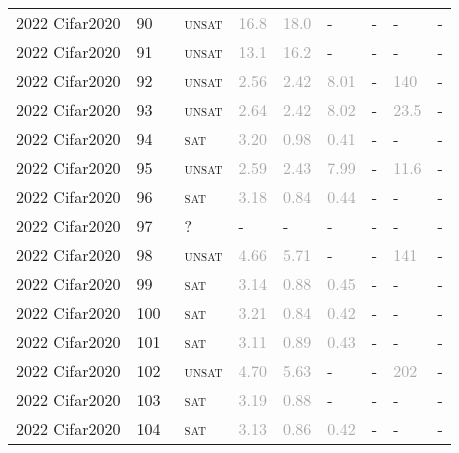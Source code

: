 \begin{center}
{\begin{longtable}{@{}lllllllll@{}}
2022 Cifar2020 & 90 & ~\textsc{unsat} & \textcolor{darkgray}{16.8} & \textcolor{darkgray}{18.0} & - & - & - & - \\
2022 Cifar2020 & 91 & ~\textsc{unsat} & \textcolor{darkgray}{13.1} & \textcolor{darkgray}{16.2} & - & - & - & - \\
2022 Cifar2020 & 92 & ~\textsc{unsat} & \textcolor{darkgray}{2.56} & \textcolor{darkgray}{2.42} & \textcolor{darkgray}{8.01} & - & \textcolor{darkgray}{140} & - \\
2022 Cifar2020 & 93 & ~\textsc{unsat} & \textcolor{darkgray}{2.64} & \textcolor{darkgray}{2.42} & \textcolor{darkgray}{8.02} & - & \textcolor{darkgray}{23.5} & - \\
2022 Cifar2020 & 94 & ~\textsc{sat} & \textcolor{darkgray}{3.20} & \textcolor{darkgray}{0.98} & \textcolor{darkgray}{0.41} & - & - & - \\
2022 Cifar2020 & 95 & ~\textsc{unsat} & \textcolor{darkgray}{2.59} & \textcolor{darkgray}{2.43} & \textcolor{darkgray}{7.99} & - & \textcolor{darkgray}{11.6} & - \\
2022 Cifar2020 & 96 & ~\textsc{sat} & \textcolor{darkgray}{3.18} & \textcolor{darkgray}{0.84} & \textcolor{darkgray}{0.44} & - & - & - \\
2022 Cifar2020 & 97 & ~? & - & - & - & - & - & - \\
2022 Cifar2020 & 98 & ~\textsc{unsat} & \textcolor{darkgray}{4.66} & \textcolor{darkgray}{5.71} & - & - & \textcolor{darkgray}{141} & - \\
2022 Cifar2020 & 99 & ~\textsc{sat} & \textcolor{darkgray}{3.14} & \textcolor{darkgray}{0.88} & \textcolor{darkgray}{0.45} & - & - & - \\
2022 Cifar2020 & 100 & ~\textsc{sat} & \textcolor{darkgray}{3.21} & \textcolor{darkgray}{0.84} & \textcolor{darkgray}{0.42} & - & - & - \\
2022 Cifar2020 & 101 & ~\textsc{sat} & \textcolor{darkgray}{3.11} & \textcolor{darkgray}{0.89} & \textcolor{darkgray}{0.43} & - & - & - \\
2022 Cifar2020 & 102 & ~\textsc{unsat} & \textcolor{darkgray}{4.70} & \textcolor{darkgray}{5.63} & - & - & \textcolor{darkgray}{202} & - \\
2022 Cifar2020 & 103 & ~\textsc{sat} & \textcolor{darkgray}{3.19} & \textcolor{darkgray}{0.88} & - & - & - & - \\
2022 Cifar2020 & 104 & ~\textsc{sat} & \textcolor{darkgray}{3.13} & \textcolor{darkgray}{0.86} & \textcolor{darkgray}{0.42} & - & - & - \\

\end{longtable}}
\end{center}
